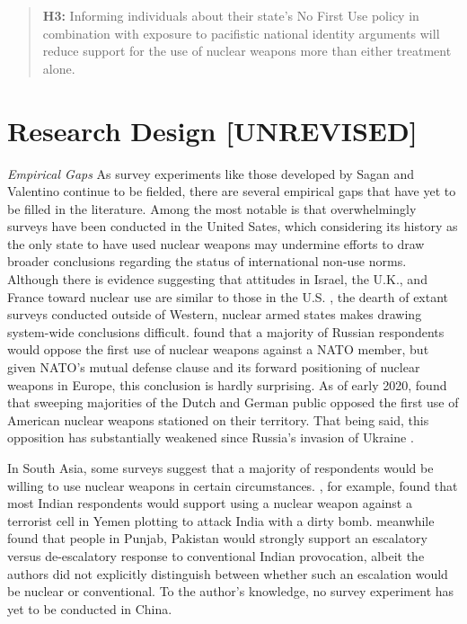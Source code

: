 \documentclass[12pt]{article}
\begin{document}
\begin{quote}
\textbf{H3:} Informing individuals about their state’s No First Use policy in combination with exposure to pacifistic national identity arguments will reduce support for the use of nuclear weapons more than either treatment alone.
\end{quote}

\section{Research Design [UNREVISED]}

\textit{Empirical Gaps}
\noindent
As survey experiments like those developed by Sagan and Valentino continue to be fielded, there are several empirical gaps that have yet to be filled in the literature. Among the most notable is that overwhelmingly surveys have been conducted in the United Sates, which considering its history as the only state to have used nuclear weapons may undermine efforts to draw broader conclusions regarding the status of international non-use norms. Although there is evidence suggesting that attitudes in Israel, the U.K., and France toward nuclear use are similar to those in the U.S. \citep{dill_kettles_2022}, the dearth of extant surveys conducted outside of Western, nuclear armed states makes drawing system-wide conclusions difficult. \citet{smetana_moscow_2022} found that a majority of Russian respondents would oppose the first use of nuclear weapons against a NATO member, but given NATO's mutual defense clause and its forward positioning of nuclear weapons in Europe, this conclusion is hardly surprising. As of early 2020, \citet{onderco_ideology_2022} found that sweeping majorities of the Dutch and German public opposed the first use of American nuclear weapons stationed on their territory. That being said, this opposition has substantially weakened since Russia's invasion of Ukraine \citep{onderco_hawks_2023}.

In South Asia, some surveys suggest that a majority of respondents would be willing to use nuclear weapons in certain circumstances. \citet{schwartz_when_2024}, for example, found that most Indian respondents would support using a nuclear weapon against a terrorist cell in Yemen plotting to attack India with a dirty bomb. \citet{clary_public_2021} meanwhile found that people in Punjab, Pakistan would strongly support an escalatory versus de-escalatory response to conventional Indian provocation, albeit the authors did not explicitly distinguish between whether such an escalation would be nuclear or conventional. To the author's knowledge, no survey experiment has yet to be conducted in China.
\end{document}
